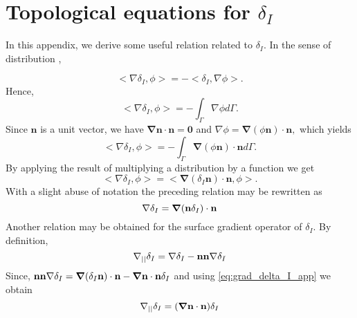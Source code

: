 \section{Topological equations for $\delta_I$}
\label{ap:delta_I}
In this appendix, we derive some useful relation related to $\delta_I$. In the sense of distribution \citep{appel2007}, 

\begin{equation}
<\nabla \delta_I,\phi> = - <\delta_I,\nabla \phi>.
\end{equation}
Hence,
\begin{equation}
<\nabla \delta_I,\phi> = - \int_{\Gamma} \nabla \phi d\Gamma.
\label{eq:1grad_delta_I}
\end{equation}
Since $\textbf{n}$ is a unit vector, we have $\bm\nabla \textbf{n} \cdot \textbf{n} =\bm 0$ and%
$\nabla \phi= \bm\nabla (\phi \textbf{n}) \cdot \textbf{n},$
which yields 
\begin{equation}
<\nabla \delta_I,\phi> = - \int_{\Gamma} \bm\nabla (\phi \textbf{n}) \cdot \textbf{n} d\Gamma. 
\end{equation}
By applying the result of multiplying a distribution by a function we get \citep{appel2007} %
\begin{equation}
<\nabla \delta_I,\phi> = <\bm\nabla (\delta _I \textbf{n}) \cdot \textbf{n},\phi>.
\end{equation}
With a slight abuse of notation the preceding relation may be rewritten as
\begin{equation}
    \mathbf{\nabla}\delta_I 
    =   \bm\nabla (\textbf{n} \delta_I) \cdot \textbf{n}
    \label{eq:grad_delta_I_app}
\end{equation}
Another relation may be obtained for the surface gradient operator of $\delta_I$. By definition,
\begin{equation}
  \mathbf{\nabla}_{||} \delta_I  = \mathbf{\nabla}\delta_I - \textbf{nn}\mathbf{\nabla}\delta_I
\end{equation}
Since, $\textbf{nn}\mathbf{\nabla}\delta_I = \bm{\mathbf{\nabla}} (\delta_I\textbf{n})\cdot \textbf{n}-\bm{\mathbf{\nabla}}\textbf{n}\cdot \textbf{n} \delta_I$ and using \ref{eq:grad_delta_I_app} we obtain
\begin{equation}
  \mathbf{\nabla}_{||} \delta_I  = (\bm{\mathbf{\nabla}}\textbf{n}\cdot \textbf{n}) \delta_I
\label{eq:gradI_deltaI}
\end{equation}


